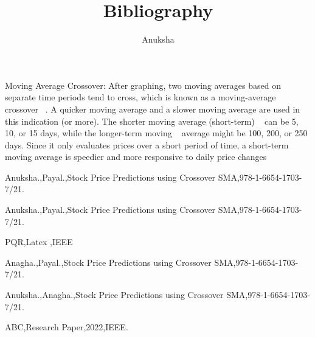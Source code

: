 \documentclass[11pt,a4paper]{report}
\author{Anuksha}
\title{Bibliography}
\begin{document}
\maketitle

Moving Average Crossover: After graphing, two 
moving averages based on separate time periods tend to cross, 
which is known as a moving-average crossover ~\cite{abc}. A quicker 
moving average and a slower moving average are used in this 
indication (or more). The shorter moving average (short-term) ~\cite{pqr}
can be 5, 10, or 15 days, while the longer-term moving ~\cite{aa,Anuksha}
average might be 100, 200, or 250 days. Since it only 
evaluates prices over a short period of time, a short-term 
moving average is speedier and more responsive to daily 
price changes ~\cite{Anuksha,Payal,Anagha}


\begin{thebibliography} {}

Anuksha.,Payal.,Stock Price Predictions using Crossover SMA,978-1-6654-1703-7/21.

 Anuksha.,Payal.,Stock Price Predictions using Crossover SMA,978-1-6654-1703-7/21.

 PQR,Latex ,IEEE

 Anagha.,Payal.,Stock Price Predictions using Crossover SMA,978-1-6654-1703-7/21.

 Anuksha.,Anagha.,Stock Price Predictions using Crossover SMA,978-1-6654-1703-7/21.

 ABC,Research Paper,2022,IEEE.



\end{thebibliography} 
\end{document}
